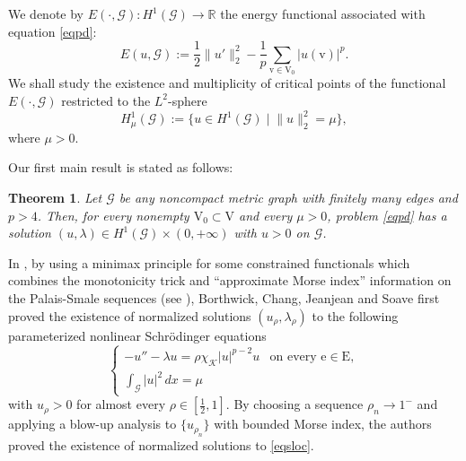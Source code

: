\documentclass[11pt]{amsart}
\newtheorem{theorem}{Theorem}[section]
\newcommand{\abs}[1]{\lvert#1\rvert}
\newcommand{\norm}[1]{\lVert#1\rVert}
\newcommand{\G}{\mathcal{G}}
\newcommand{\K}{\mathcal{K}}
\newcommand{\E}{\mathrm{E}}
\newcommand{\V}{\mathrm{V}}
\newcommand{\e}{\mathrm{e}}
\newcommand{\vv}{\mathrm{v}}
\numberwithin{equation}{section}
\begin{document}
We denote by $E( \cdot,\G): H^1(\G) \to \mathbb{R}$ the energy functional associated with equation \eqref{eqpd}:
\begin{equation}\label{func}
E(u,\G) := \frac{1}{2}\norm{u'}^{2}_2-\frac{1}{p}\sum_{\vv \in \V_0}\abs{u(\vv)}^p.
\end{equation}
We shall study the existence and multiplicity of critical points of the functional $E( \cdot,\G)$ restricted to the $L^2$-sphere
$$
H^1_\mu(\G):=\{u \in H^1(\G) \mid \norm{u}^2_2=\mu\},
$$
where $\mu > 0$.

Our first main result is stated as follows:
\begin{theorem}\label{th1}
     Let $\G$ be any noncompact metric graph with finitely many edges and $p>4$. Then, for every nonempty $\V_0 \subset \V$ and every $\mu>0$, problem \eqref{eqpd} has a solution $(u,\lambda)\in H^1(\G) \times (0,+\infty)$ with $u>0$ on $\G$.
\end{theorem}

In \cite{Bort},  by using a minimax principle for some constrained functionals which combines the monotonicity trick and  “approximate Morse index” information on the Palais-Smale sequences (see \cite{Bort0}), Borthwick, Chang, Jeanjean and Soave first proved the existence of normalized solutions $(u_\rho,\lambda_\rho)$ to the following parameterized nonlinear Schr\"{o}dinger equations
\begin{equation}
\label{eqslocrho}
    \begin{cases}
    -u'' - \lambda u= \rho\chi_\K\abs{u}^{p-2}u & \text{on every } \e \in \E, \\ 
    \int_\G \abs{u}^2\, dx = \mu &
    \end{cases}
\end{equation}
 with $u_\rho>0$ for almost every $\rho \in [\frac{1}{2},1]$. By choosing a sequence $\rho_n\to1^-$ and applying a blow-up analysis to $\{u_{\rho_n}\}$ with bounded Morse index, the authors proved the existence of normalized solutions to \eqref{eqsloc}.
 
\end{document}

